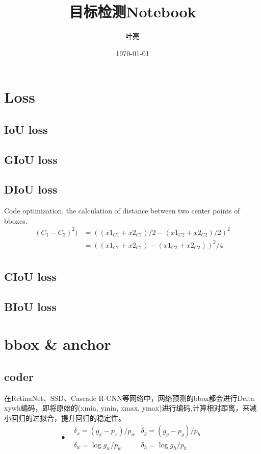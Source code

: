 \documentclass{article}
\title{目标检测Notebook}
\author{叶亮}
\date{\today}
\begin{document}
 
\maketitle
\section{Loss}
\subsection{IoU loss}


\subsection{GIoU loss}

\subsection{DIoU loss}

Code optimization, the calculation of distance between two center points of bboxes.
\begin{equation}
\begin{aligned}
(C_1-C_2)^2)&= ((x1_{C1}+x2_{C1})/2-(x1_{C2}+x2_{C2})/2)^2 \\
&=((x1_{C1}+x2_{C1})-(x1_{C2}+x2_{C2}))^2/4 \\
\end{aligned}
\end{equation}
\subsection{CIoU loss}
\subsection{BIoU loss}

\section{bbox \& anchor}

\subsection{coder}
在RetinaNet、SSD、Cascade R-CNN等网络中，网络预测的bbox都会进行Delta xywh编码，即将原始的(xmin, ymin, xmax, ymax)进行编码,计算相对距离，来减小回归的过拟合，提升回归的稳定性。
\begin{equation}\textbf{•}
\begin{aligned}
&\delta_x = (g_x-p_x)/p_w	   & \delta_y = (g_y - p_y)/p_h \\
&\delta_w = \log{g_w/p_w}	&\delta_h = \log{g_h/p_h}
\end{aligned}\label{bbox_coder}
\end{equation}
\end{document}
